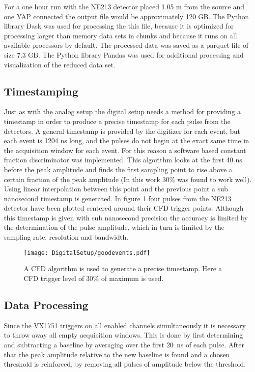 \documentclass[main.tex]{subfiles}
\begin{document}
For a one hour run with the NE213 detector placed 1.05 m from the source and one YAP connected the output file would be approximately 120 GB. The Python library Dask was used for processing the this file, because it is optimized for processing larger than memory data sets in chunks and because it runs on all available processors by default\cite{Dask}. The processed data was saved as a parquet file of size 7.3 GB. The Python library Pandas was used for additional processing and visualization of the reduced data set\cite{Pandas}.

\subsection{Timestamping}
Just as with the analog setup the digital setup needs a method for providing a timestamp in order to produce a precise timestamp for each pulse from the detectors. A general timestamp is provided by the digitizer for each event, but each event is 1204 ns long, and the pulses do not begin at the exact same time in the acquisition window for each event. For this reason a software based constant fraction discriminator was implemented. This algorithm looks at the first 40 ns before the peak amplitude and finds the first sampling point to rise above  a certain fraction of the peak amplitude (In this work 30\% was found to work well). Using linear interpolation between this point and the previous point a sub nanosecond timestamp is generated. In figure \ref{fig:cfd_trig} four pulses from the NE213 detector have been plotted centered around their CFD trigger points. Although this timestamp is given with sub nanosecond precision the accuracy is limited by the determination of the pulse amplitude, which in turn is limited by the sampling rate, resolution and bandwidth. 

\begin{figure}[ht!]
    \centering
        \texttt{[image: DigitalSetup/goodevents.pdf]}
        \caption[Examples of digitized pulses and their CFD trigger points]{A CFD algorithm is used to generate a precise timestamp. Here a CFD trigger level of 30\% of maximum is used.}
    \label{fig:cfd_trig} 
\end{figure}

\subsection{Data Processing}
Since the VX1751 triggers on all enabled channels simultaneously it is necessary to throw away all empty acquisition windows. This is done by first determining and subtracting a baseline by averaging over the first \si{20\nano\second} of each pulse. After that the peak amplitude relative to the new baseline is found and a chosen threshold is reinforced, by removing all pulses of amplitude below the threshold.
\end{document}
